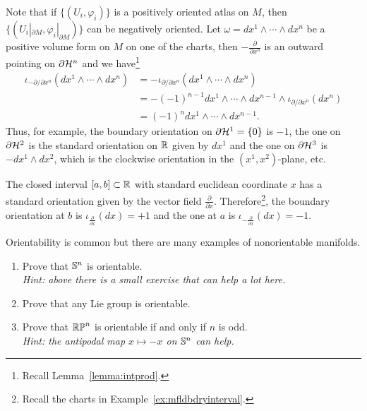 Note that if $\{(U_i, \varphi_i)\}$ is a positively oriented atlas on $M$, then $\{(U_i|_{\partial M}, \varphi_i|_{\partial M})\}$ can be negatively oriented. 
Let $\omega = dx^1\wedge\cdots\wedge dx^n$ be a positive volume form on $M$ on one of the charts, then $-\frac{\partial}{\partial x^n}$ is an outward pointing on $\partial \mathcal{H}^n$ and we have\footnote{Recall Lemma~\ref{lemma:intprod}.}
\begin{align}
  \iota_{-{\partial}/\!{\partial x^n}} (dx^1\wedge\cdots\wedge dx^n)
  &= -\iota_{{\partial}/\!{\partial x^n}} (dx^1\wedge\cdots\wedge dx^n) \\
  &= -(-1)^{n-1} dx^1\wedge\cdots\wedge dx^{n-1}\wedge \iota_{{\partial}/\!{\partial x^n}} (dx^n) \\
  &= (-1)^n dx^1\wedge\cdots\wedge dx^{n-1}.
\end{align}
Thus, for example, the boundary orientation on $\partial \mathcal{H}^1 = \{0\}$ is $-1$, the one on $\partial \mathcal{H}^2$ is the standard orientation on $\mathbb{R}$ given by $dx^1$ and the one on $\partial \mathcal{H}^3$ is $-dx^1\wedge dx^2$, which is the clockwise orientation in the $(x^1, x^2)$-plane, etc.

\begin{example}\label{ex:int:bdryo}
  The closed interval $[a,b]\subset\mathbb{R}$ with standard euclidean coordinate $x$ has a standard orientation given by the vector field $\frac{\partial}{\partial x}$. 
  Therefore\footnote{Recall the charts in Example~\ref{ex:mfldbdryinterval}.}, the boundary orientation at $b$ is $\iota_{\frac{\partial}{\partial x}}(dx) = +1$ and the one at $a$ is $\iota_{-\frac{\partial}{\partial x}}(dx) = -1$.
\end{example}

\begin{exercise}
  Orientability is common but there are many examples of nonorientable manifolds.
  \begin{enumerate}
    \item Prove that $\mathbb{S}^n$ is orientable.\\
      \textit{\small Hint: above there is a small exercise that can help a lot here.}
    \item Prove that any Lie group is orientable.
    \item Prove that $\mathbb{RP}^n$ is orientable if and only if $n$ is odd. \\
      \textit{\small Hint: the antipodal map $x\mapsto -x$ on $\mathbb{S}^n$ can help.}
  \end{enumerate}
\end{exercise}

